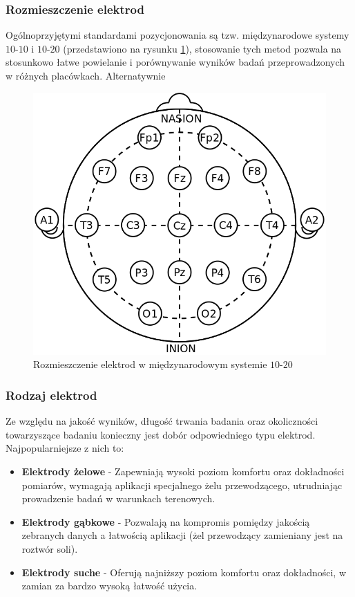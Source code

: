 \documentclass{./assets/wfis}
\begin{document}
\subsubsection{Rozmieszczenie elektrod}
Ogólnoprzyjętymi standardami pozycjonowania są tzw. międzynarodowe systemy $10$-$10$ i $10$-$20$ (przedstawiono na rysunku \ref{fig:10-20-system}), stosowanie tych metod pozwala na stosunkowo łatwe powielanie i porównywanie wyników badań przeprowadzonych w różnych placówkach. Alternatywnie 

\begin{figure}[h]
    \centering
    \includegraphics[width=0.5\columnwidth]{thesis/assets/10-20_system_electrodes.png}
    \caption{Rozmieszczenie elektrod w międzynarodowym systemie $10$-$20$}
    \label{fig:10-20-system}
\end{figure}

\subsubsection{Rodzaj elektrod}
Ze względu na jakość wyników, długość trwania badania oraz okoliczności towarzyszące badaniu konieczny jest dobór odpowiedniego typu elektrod. Najpopularniejsze z nich to:

\begin{itemize}
    \item \textbf{Elektrody żelowe} - Zapewniają wysoki poziom komfortu oraz dokładności pomiarów, wymagają aplikacji specjalnego żelu przewodzącego, utrudniając prowadzenie badań w warunkach terenowych.
    \item \textbf{Elektrody gąbkowe} - Pozwalają na kompromis pomiędzy jakością zebranych danych a łatwością aplikacji (żel przewodzący zamieniany jest na roztwór soli).
    \item \textbf{Elektrody suche} - Oferują najniższy poziom komfortu oraz dokładności, w zamian za bardzo wysoką łatwość użycia.
\end{itemize}
\end{document}

